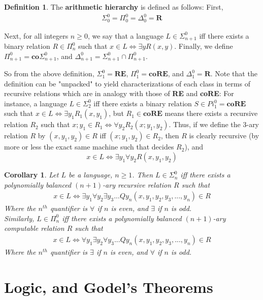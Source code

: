\documentclass{article}
\theoremstyle{definition}
\newtheorem{definition}{Definition}[section]
\theoremstyle{plain}
\theoremstyle{theorem}
\newtheorem{corollary}{Corollary}[section]
\begin{document}
\begin{definition}
    The \textbf{arithmetic hierarchy} is defined as follows: First,
    \begin{align}
        \Sigma_0^0 = \Pi_0^0 = \Delta_0^0 = \textbf{R}
    \end{align}
    \par Next, for all integers $n \geq 0$, we say that a language $L \in \Sigma_{n+1}^0$ iff there exists a binary relation $R \in \Pi_n^0$ such that $x \in L \iff \exists y R(x,y)$. Finally, we define $\Pi_{n+1}^0 = \textbf{co}\Sigma_{n+1}^0$, and $\Delta_{n+1}^0 = \Sigma_{n+1}^0 \cap \Pi_{n+1}^0$.
\end{definition}
So from the above definition, $\Sigma_1^0 = \textbf{RE}$, $\Pi_1^0 = \textbf{coRE}$, and $\Delta_1^0 = \textbf{R}$. Note that the definition can be "unpacked" to yield characterizations of each class in terms of recursive relations which are in analogy with those of \textbf{RE} and \textbf{coRE}: For instance, a language $L \in \Sigma_2^0$ iff there exists a binary relation $S \in Pi_1^0 = \textbf{coRE}$ such that $x \in L \iff \exists y_1 R_1(x,y_1)$, but $R_1 \in \textbf{coRE}$ means there exists a recursive relation $R_2$ such that $x;y_1 \in R_1 \iff \forall y_2 R_2(x;y_1,y_2)$. Thus, if we define the $3$-ary relation $R$ by $(x,y_1,y_2) \in R$ iff $(x;y_1,y_2) \in R_2$, then $R$ is clearly recursive (by more or less the exact same machine such that decides $R_2$), and  
\[ x \in L \iff \exists y_1 \forall y_2 R(x,y_1,y_2) \] 
\begin{corollary}
    Let $L$ be a language, $n \geq 1$. Then $L \in \Sigma_n^0$ iff there exists a polynomially balanced $(n+1)$-ary recursive relation $R$ such that
    \begin{align}
        x \in L \iff \exists y_1 \forall y_2 \exists y_3 ... Q y_n(x,y_1,y_2,y_3,...,y_n) \in R
    \end{align}
    Where the $n^{th}$ quantifier is $\forall$ if $n$ is even, and $\exists$ if $n$ is odd. \\
    Similarly, $L \in \Pi_n^0$ iff there exists a polynomially balanced $(n+1)$-ary computable relation $R$ such that
    \begin{align}
         x \in L \iff \forall y_1 \exists y_2 \forall y_3 ... Q y_n(x,y_1,y_2,y_3,...,y_n) \in R
    \end{align}
    Where the $n^{th}$ quantifier is $\exists$ if $n$ is even, and $\forall$ if $n$ is odd.
\end{corollary}
\section{Logic, and Godel's Theorems}
\end{document}
